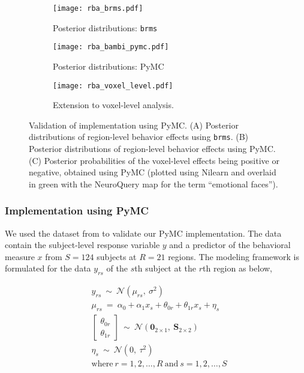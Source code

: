 \documentclass[../main.tex]{subfiles}
\begin{document}
\begin{figure*}[t!]
\centering
\begin{subfigure}{.5\textwidth}
    \centering
    \caption{Posterior distributions: \texttt{brms}}
    \texttt{[image: rba\_brms.pdf]}
    \label{fig:sub1}
\end{subfigure}%
\begin{subfigure}{.5\textwidth}
    \centering
    \caption{Posterior distributions: PyMC}
    \texttt{[image: rba\_bambi\_pymc.pdf]}
    \label{fig:sub2}
\end{subfigure}
\begin{subfigure}{.9\textwidth}
    \centering
    \caption{Extension to voxel-level analysis. }
    \texttt{[image: rba\_voxel\_level.pdf]}
    \label{fig:vox}
\end{subfigure}

\caption{Validation of implementation using PyMC. (A) Posterior distributions of region-level behavior effects using \texttt{brms}. (B) Posterior distributions of region-level behavior effects using PyMC. (C) Posterior probabilities of the voxel-level effects being positive or negative, obtained using PyMC (plotted using Nilearn and overlaid in green with the NeuroQuery \parencite{dockes_neuroquery_2020} map for the term ``emotional faces'').}
\label{fig:rba}
\end{figure*}
\subsubsection{Implementation using PyMC}

We used the dataset from \textcite{chenHandlingMultiplicityNeuroimaging2019} to validate our PyMC implementation. The data contain the subject-level response variable $y$ and a predictor of the behavioral measure $x$ from $S=124$ subjects at $R=21$ regions. The modeling framework is formulated for the data $y_{rs}$ of the $s$th subject at the $r$th region as below,

\begin{equation}\label{eq:bml}
    \begin{split}
	&y_{rs}~\sim~\mathcal{N}(\mu_{rs},~\sigma^2) \\
	&\mu_{rs}~=~\alpha_0+\alpha_1 x_s + \theta_{0r}+\theta_{1r} x_s +\eta_s\\
	&\!\!\begin{bmatrix}
	\theta_{0r} \\
	\theta_{1r} 
	\end{bmatrix}~\sim~\mathcal{N}(\boldsymbol{0}_{2\times 1},~\boldsymbol{S}_{2\times 2}) \\
	&\eta_{s}~\sim~\mathcal{N}(0,~\tau^2) \\
	&\text{where}~r=1,2,\ldots,R~\text{and}~s=1,2,\ldots,S
    \end{split}
\end{equation}
\end{document}
